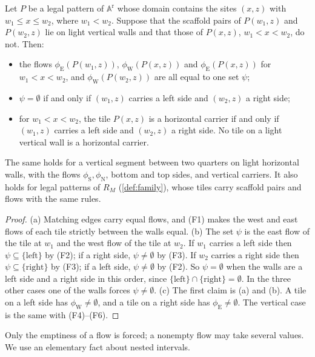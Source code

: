 \begin{proposition}\label{prop:routing}
Let $P$ be a legal pattern of $\mathbb A^{\mathrm r}$ whose domain contains the sites $(x,z)$ with $w_1\le x\le w_2$, where $w_1<w_2$. Suppose that the scaffold pairs of $P(w_1,z)$ and $P(w_2,z)$ lie on light vertical walls and that those of $P(x,z)$, $w_1<x<w_2$, do not. Then:
\begin{itemize}
\item[(a)] the flows $\phi_{\mathrm E}(P(w_1,z))$, $\phi_{\mathrm W}(P(x,z))$ and $\phi_{\mathrm E}(P(x,z))$ for $w_1<x<w_2$, and $\phi_{\mathrm W}(P(w_2,z))$ are all equal to one set $\psi$;
\item[(b)] $\psi=\emptyset$ if and only if $(w_1,z)$ carries a left side and $(w_2,z)$ a right side;
\item[(c)] for $w_1<x<w_2$, the tile $P(x,z)$ is a horizontal carrier if and only if $(w_1,z)$ carries a left side and $(w_2,z)$ a right side. No tile on a light vertical wall is a horizontal carrier.
\end{itemize}
The same holds for a vertical segment between two quarters on light horizontal walls, with the flows $\phi_{\mathrm S},\phi_{\mathrm N}$, bottom and top sides, and vertical carriers. It also holds for legal patterns of $R_M$ (\cref{def:family}), whose tiles carry scaffold pairs and flows with the same rules.
\end{proposition}

\begin{proof}
(a) Matching edges carry equal flows, and (F1) makes the west and east flows of each tile strictly between the walls equal. (b) The set $\psi$ is the east flow of the tile at $w_1$ and the west flow of the tile at $w_2$. If $w_1$ carries a left side then $\psi\subseteq\{\mathrm{left}\}$ by (F2); if a right side, $\psi\ne\emptyset$ by (F3). If $w_2$ carries a right side then $\psi\subseteq\{\mathrm{right}\}$ by (F3); if a left side, $\psi\ne\emptyset$ by (F2). So $\psi=\emptyset$ when the walls are a left side and a right side in this order, since $\{\mathrm{left}\}\cap\{\mathrm{right}\}=\emptyset$. In the three other cases one of the walls forces $\psi\ne\emptyset$. (c) The first claim is (a) and (b). A tile on a left side has $\phi_{\mathrm W}\ne\emptyset$, and a tile on a right side has $\phi_{\mathrm E}\ne\emptyset$. The vertical case is the same with (F4)--(F6).
\end{proof}

Only the emptiness of a flow is forced; a nonempty flow may take several values. We use an elementary fact about nested intervals.

